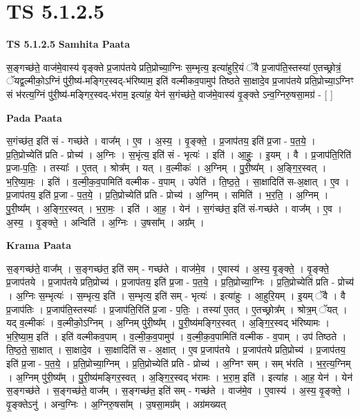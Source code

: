 \documentclass[17pt]{extarticle}
\begin{document}
\section{ TS 5.1.2.5 }

\textbf{TS 5.1.2.5 } \newline
\textbf{Samhita Paata} \newline

स॒ङ्गच्छ॑ते॒ वाज॑मे॒वास्य॑ वृङ्क्ते प्र॒जाप॑तये प्रति॒प्रोच्या॒ग्निः स॒म्भृत्य॒ इत्या॑हुरि॒यं ॅवै प्र॒जाप॑ति॒स्तस्या॑ ए॒तच्छ्रोत्रं॒ ॅयद्व॒ल्मीको॒ऽग्निं पु॑री॒ष्य॑-मङ्गिर॒स्वद्-भ॑रिष्याम॒ इति॑ वल्मीकव॒पामुप॑ तिष्ठते सा॒क्षादे॒व प्र॒जाप॑तये प्रति॒प्रोच्या॒ऽग्निꣳ सं भ॑रत्य॒ग्निं पु॑री॒ष्य॑-मङ्गिर॒स्वद्-भ॑राम॒ इत्या॑ह॒ येन॑ स॒गंच्छ॑ते॒ वाज॑मे॒वास्य॑ वृ॒ङ्क्ते ऽन्व॒ग्निरु॒षसा॒मग्र॑ - [  ] \newline

\textbf{Pada Paata} \newline

स॒गंच्छ॑त॒ इति॑ सं - गच्छ॑ते । वाज᳚म् । ए॒व । अ॒स्य॒ । वृ॒ङ्क्ते॒ । प्र॒जाप॑तय॒ इति॑ प्र॒जा - प॒त॒ये॒ । प्र॒ति॒प्रोच्येति॑ प्रति - प्रोच्य॑ । अ॒ग्निः । स॒भृंत्य॒ इति॑ सं - भृत्यः॑ । इति॑ । आ॒हुः॒ । इ॒यम् । वै । प्र॒जाप॑ति॒रिति॑ प्र॒जा-प॒तिः॒ । तस्याः᳚ । ए॒तत् । श्रोत्र᳚म् । यत् । व॒ल्मीकः॑ । अ॒ग्निम् । पु॒री॒ष्य᳚म् । अ॒ङ्गि॒र॒स्वत् । भ॒रि॒ष्या॒मः॒ । इति॑ । व॒ल्मी॒क॒व॒पामिति॑ वल्मीक - व॒पाम् । उपेति॑ । ति॒ष्ठ॒ते॒ । सा॒क्षादिति॑ स-अ॒क्षात् । ए॒व । प्र॒जाप॑तय॒ इति॑ प्र॒जा - प॒त॒ये॒ । प्र॒ति॒प्रोच्येति॑ प्रति - प्रोच्य॑ । अ॒ग्निम् । समिति॑ । भ॒र॒ति॒ । अ॒ग्निम् । पु॒री॒ष्य᳚म् । अ॒ङ्गि॒र॒स्वत् । भ॒रा॒मः॒ । इति॑ । आ॒ह॒ । येन॑ । स॒गंच्छ॑त॒ इति॑ सं-गच्छ॑ते । वाज᳚म् । ए॒व । अ॒स्य॒ । वृ॒ङ्क्ते॒ । अन्विति॑ । अ॒ग्निः । उ॒षसा᳚म् । अग्र᳚म् ।  \newline


\textbf{Krama Paata} \newline

स॒ङ्गच्छ॑ते॒ वाज᳚म् । स॒ङ्गच्छ॑त॒ इति॑ सम् - गच्छ॑ते । वाज॑मे॒व । ए॒वास्य॑ । अ॒स्य॒ वृ॒ङ्क्ते॒ । वृ॒ङ्क्ते॒ प्र॒जाप॑तये । प्र॒जाप॑तये प्रति॒प्रोच्य॑ । प्र॒जाप॑तय॒ इति॑ प्र॒जा - प॒त॒ये॒ । प्र॒ति॒प्रोच्या॒ग्निः । प्र॒ति॒प्रोच्येति॑ प्रति - प्रोच्य॑ । अ॒ग्निः स॒म्भृत्यः॑ । स॒म्भृत्य॒ इति॑ । स॒म्भृत्य॒ इति॑ सम् - भृत्यः॑ । इत्या॑हुः । आ॒हुरि॒यम् । इ॒यम् ॅवै । वै प्र॒जाप॑तिः । प्र॒जाप॑ति॒स्तस्याः᳚ । प्र॒जाप॑ति॒रिति॑ प्र॒जा - प॒तिः॒ । तस्या॑ ए॒तत् । ए॒तच्छ्रोत्र᳚म् । श्रोत्र॒म् ॅयत् । यद् व॒ल्मीकः॑ । व॒ल्मीको॒ऽग्निम् । अ॒ग्निम् पु॑री॒ष्य᳚म् । पु॒री॒ष्य॑मङ्गिर॒स्वत् । अ॒ङ्गि॒र॒स्वद् भ॑रिष्यामः । भ॒रि॒ष्या॒म॒ इति॑ । इति॑ वल्मीकव॒पाम् । व॒ल्मी॒क॒व॒पामुप॑ । व॒ल्मी॒क॒व॒पामिति॑ वल्मीक - व॒पाम् । उप॑ तिष्ठते । ति॒ष्ठ॒ते॒ सा॒क्षात् । सा॒क्षादे॒व । सा॒क्षादिति॑ स - अ॒क्षात् । ए॒व प्र॒जाप॑तये । प्र॒जाप॑तये प्रति॒प्रोच्य॑ । प्र॒जाप॑तय॒ इति॑ प्र॒जा - प॒त॒ये॒ । प्र॒ति॒प्रोच्या॒ग्निम् । प्र॒ति॒प्रोच्येति॑ प्रति - प्रोच्य॑ । अ॒ग्निꣳ सम् । सम् भ॑रति । भ॒र॒त्य॒ग्निम् । अ॒ग्निम् पु॑री॒ष्य᳚म् । पु॒री॒ष्य॑मङ्गिर॒स्वत् । अ॒ङ्गि॒र॒स्वद् भ॑रामः । भ॒रा॒म॒ इति॑ । इत्या॑ह । आ॒ह॒ येन॑ । येन॑ स॒ङ्गच्छ॑ते । स॒ङ्गच्छ॑ते॒ वाज᳚म् । स॒ङ्गच्छ॑त॒ इति॑ सम् - गच्छ॑ते । वाज॑मे॒व । ए॒वास्य॑ । अ॒स्य॒ वृ॒ङ्क्ते॒ । वृ॒ङ्क्तेऽनु॑ । अन्व॒ग्निः । अ॒ग्निरु॒षसा᳚म् । उ॒षसा॒मग्र᳚म् । अग्र॑मख्यत् \newline
\end{document}

